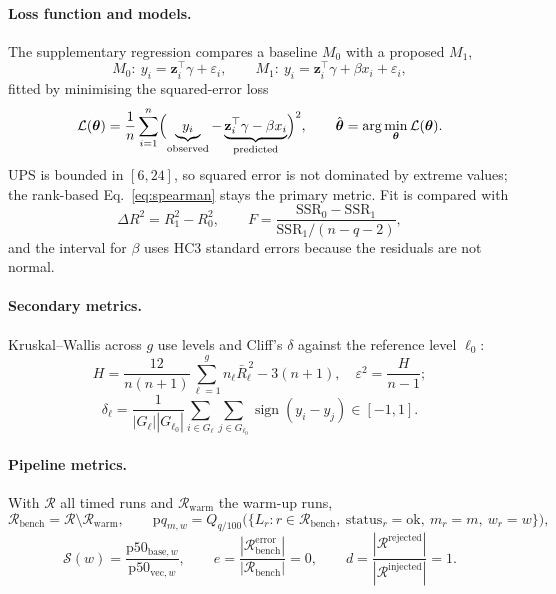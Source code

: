 \documentclass[11pt,a4paper]{article}
\begin{document}
\paragraph{Loss function and models.} The supplementary regression compares a baseline $M_0$ with a proposed $M_1$,
\begin{equation}
M_0:\ y_i=\mathbf z_i^\top\gamma+\varepsilon_i,\qquad M_1:\ y_i=\mathbf z_i^\top\gamma+\beta x_i+\varepsilon_i,
\label{eq:models}
\end{equation}
fitted by minimising the squared-error loss
\begin{equation}
\mathcal L(\boldsymbol\theta)=\frac1n\sum_{i=1}^{n}\Bigl(\underbrace{y_i}_{\text{observed}}-\underbrace{\mathbf z_i^\top\gamma-\beta x_i}_{\text{predicted}}\Bigr)^2,\qquad
\hat{\boldsymbol\theta}=\arg\min_{\boldsymbol\theta}\mathcal L(\boldsymbol\theta).
\label{eq:loss}
\end{equation}
UPS is bounded in $[6,24]$, so squared error is not dominated by extreme values; the rank-based Eq.~\eqref{eq:spearman} stays the primary metric. Fit is compared with
\begin{equation}
\Delta R^2=R^2_1-R^2_0,\qquad F=\frac{\mathrm{SSR}_0-\mathrm{SSR}_1}{\mathrm{SSR}_1/(n-q-2)},
\label{eq:fit}
\end{equation}
and the interval for $\beta$ uses HC3 standard errors because the residuals are not normal.

\paragraph{Secondary metrics.} Kruskal--Wallis across $g$ use levels and Cliff's $\delta$ against the reference level $\ell_0$:
\begin{equation}
H=\frac{12}{n(n+1)}\sum_{\ell=1}^{g}n_\ell\bar R_\ell^{\,2}-3(n+1),\quad \varepsilon^2=\frac{H}{n-1};
\label{eq:kw}
\end{equation}
\begin{equation}
\delta_\ell=\frac{1}{|G_\ell||G_{\ell_0}|}\sum_{i\in G_\ell}\sum_{j\in G_{\ell_0}}\operatorname{sign}(y_i-y_j)\in[-1,1].
\label{eq:cliff}
\end{equation}

\paragraph{Pipeline metrics.} With $\mathcal R$ all timed runs and $\mathcal R_{\text{warm}}$ the warm-up runs,
\begin{equation}
\mathcal R_{\text{bench}}=\mathcal R\setminus\mathcal R_{\text{warm}},\qquad
\mathrm p q_{m,w}=Q_{q/100}\bigl(\{L_r: r\in\mathcal R_{\text{bench}},\ \text{status}_r=\text{ok},\ m_r=m,\ w_r=w\}\bigr),
\label{eq:bench}
\end{equation}
\begin{equation}
\mathcal S(w)=\frac{\mathrm p50_{\text{base},w}}{\mathrm p50_{\text{vec},w}},\qquad
e=\frac{|\mathcal R^{\text{error}}_{\text{bench}}|}{|\mathcal R_{\text{bench}}|}=0,\qquad
d=\frac{|\mathcal R^{\text{rejected}}|}{|\mathcal R^{\text{injected}}|}=1.
\label{eq:speedup}
\end{equation}
\end{document}
